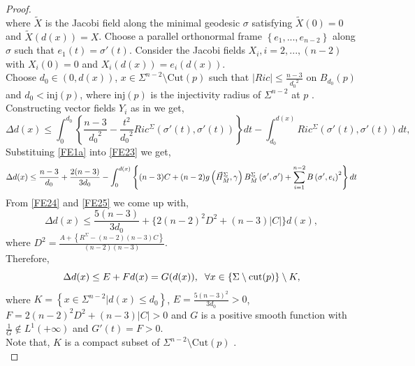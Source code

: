 \documentclass[11pt]{amsart}
\numberwithin{equation}{section}
\begin{document}
\begin{proof}
\begin{equation}
\end{equation}
where $\tilde{X}$ is the Jacobi field along the minimal geodesic $\sigma$ satisfying $\tilde{X}(0)=0$ and $\tilde{X} (d(x))=X$. Choose a parallel orthonormal frame $\left\{e_1,..., e_{n-2}\right\}$ along $\sigma$ such that $e_1(t)= \sigma'(t)$. Consider the Jacobi fields $X_i, i=2, ..., (n-2)$  with $X_i(0)=0$ and $X_i(d(x))=e_i(d(x))$.\\
Choose $d_0 \in \left(0, d(x)\right)$, $x\in \Sigma^{n-2}\setminus \text{Cut}(p)$ such that $|Ric|\le \frac{n-3}{{d_0}^2}$ on $B_{d_0}(p)$ and $d_0< \text{inj}(p)$, where $\text{inj}(p)$ is the injectivity radius of $\Sigma^{n-2}$ at $p$ .\\ 
Constructing vector fields $Y_i$ as in \cite{JA} we get,
\begin{equation}\label{FE23}
    \Delta d(x)\le \int_0^{d_0} \left\{\frac{n-3}{{d_0}^2}- \frac{t^2}{{d_0}^2} Ric^{\Sigma}\left(\sigma'(t), \sigma'(t)\right)\right\} dt- \int_{d_0}^{d(x)} Ric^{\Sigma}\left(\sigma'(t), \sigma'(t)\right) dt,
\end{equation}
Substituing \eqref{FE1a} into \eqref{FE23} we get,
\begin{equation}
    \Delta d(x)\le \frac{n-3}{d_0}+\frac{2(n-3)}{3d_0}-\int_0^{d(x)} \left\{ (n-3)C+(n-2)g\left(\vec{H}_{\Bar{M}}^{\Sigma}, \gamma\right) B_{\Bar{M}}^{\Sigma}\left(\sigma', \sigma'\right)+ \sum_{i=1}^{n-2} B\left(\sigma', e_i\right)^2\right\} dt
\end{equation}
From \eqref{FE24} and \eqref{FE25} we come up with,
\begin{equation}
    \Delta d(x)\le \frac{5(n-3)}{3d_0}+\{2(n-2)^2 D^2+(n-3)|C|\} d(x),
\end{equation}
where $D^2= \frac{A+\left\{R^{\Sigma}-(n-2)(n-3)C\right\}}{(n-2)(n-3)}$.\\
Therefore,
\begin{equation*}
    \Delta d(x)\le E+F d(x)=G(d(x)), \hspace{2mm} \forall x\in \{\Sigma\setminus \text{cut}(p)\}\setminus K,
\end{equation*}
where $K=\left\{x\in \Sigma^{n-2}| d(x)\le d_0 \right\}$, $E=\frac{5(n-3)^2}{3d_0}>0$, $F= 2(n-2)^2D^2+(n-3)|C|>0$ and $G$ is a positive smooth function with $\frac{1}{G}\notin L^{1}(+\infty)$ and $G'(t)=F>0$.\\
Note that, $K$ is a compact subset of $\Sigma^{n-2}\setminus\text{Cut}(p)$ .\\

\end{proof}
\end{document}
